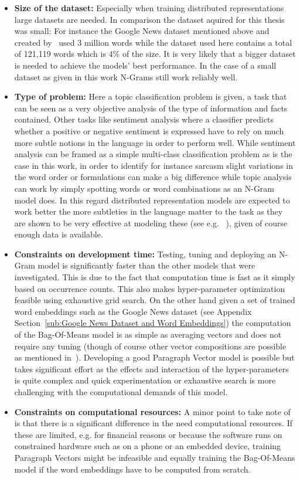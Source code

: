 \begin{itemize}
  \item \textbf{Size of the dataset:} Especially when training distributed representations large datasets are needed. In comparison the dataset aquired for this thesis was small: For instance the Google News dataset mentioned above and created by~\cite{Mikolov:2013ab} used 3 million words while the dataset used here contains a total of 121,119 words which is 4\% of the size. It is very likely that a bigger dataset is needed to achieve the models' best performance. In the case of a small dataset as given in this work N-Grams still work reliably well.
  \item \textbf{Type of problem:} Here a topic classification problem is given, a task that can be seen as a very objective analysis of the type of information and facts contained. Other tasks like sentiment analysis where a classifier predicts whether a positive or negative sentiment is expressed have to rely on much more subtle notions in the language in order to perform well. While sentiment analysis can be framed as a simple multi-class classification problem as is the case in this work, in order to identify for instance sarcasm slight variations in the word order or formulations can make a big difference while topic analysis can work by simply spotting words or word combinations as an N-Gram model does. In this regard distributed representation models are expected to work better the more subtleties in the language matter to the task as they are shown to be very effective at modeling these (see e.g. ~\cite{Mikolov:2013ac}), given of course enough data is available.
  \item \textbf{Constraints on development time:} Testing, tuning and deploying an N-Gram model is significantly faster than the other models that were investigated. This is due to the fact that computation time is fast as it simply based on occurrence counts. This also makes hyper-parameter optimization feasible using exhaustive grid search. On the other hand given a set of trained word embeddings such as the Google News dataset (see Appendix Section~\ref{sub:Google News Dataset and Word Embeddings}) the computation of the Bag-Of-Means model is as simple as averaging vectors and does not require any tuning (though of course other vector compositions are possible as mentioned in~\cite{Mitchell:2010aa}). Developing a good Paragraph Vector model is possible but takes significant effort as the effects and interaction of the hyper-parameters is quite complex and quick experimentation or exhaustive search is more challenging with the computational demands of this model.
  \item \textbf{Constraints on computational resources:} A minor point to take note of is that there is a significant difference in the need computational resources. If these are limited, e.g. for financial reasons or because the software runs on constrained hardware such as on a phone or an embedded device, training Paragraph Vectors might be infeasible and equally training the Bag-Of-Means model if the word embeddings have to be computed from scratch.
\end{itemize}


